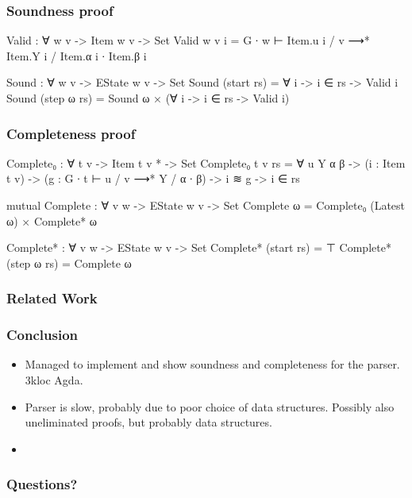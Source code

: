 \begin{frame}
	\frametitle{Soundness proof}
	\begin{code}
		  Valid : ∀ {w v} -> Item w v -> Set
		  Valid {w} {v} i = 
		    G ∙ w ⊢ Item.u i / v ⟶* Item.Y i / Item.α i ∙ Item.β i
		  
		  Sound : ∀ {w v} -> EState w v -> Set
		  Sound (start rs) = ∀ {i} -> i ∈ rs -> Valid i
		  Sound (step ω rs) = Sound ω × (∀ {i} -> i ∈ rs -> Valid i)
  	\end{code}
\end{frame}

\begin{frame}
	\frametitle{Completeness proof}
	\begin{code}
		  Complete₀ : ∀ {t v} -> Item t v * -> Set
		  Complete₀ {t} {v} rs = ∀ {u Y α β} ->
		    (i : Item t v) ->
		    (g : G ∙ t ⊢ u / v ⟶* Y / α ∙ β) ->
		    i ≋ g ->
		    i ∈ rs
		
		  mutual
		    Complete : ∀ {v w} -> EState w v -> Set
		    Complete ω = Complete₀ (Latest ω) × Complete* ω
		  
		    Complete* : ∀ {v w} -> EState w v -> Set
		    Complete* (start rs) = ⊤
		    Complete* (step ω rs) = Complete ω
	\end{code}
\end{frame}

\begin{frame}
	\frametitle{Related Work}

\end{frame}

\begin{frame}
	\frametitle{Conclusion}
	\begin{itemize}
		
		\item
			
			Managed to implement and show soundness and completeness for the
			parser. 3kloc Agda.
		
		\item
			
			Parser is slow, probably due to poor choice of data structures.
			Possibly also uneliminated proofs, but probably data structures.
		
		\item

			

	\end{itemize}
\end{frame}

\begin{frame}
	\frametitle{Questions?}
\end{frame}
